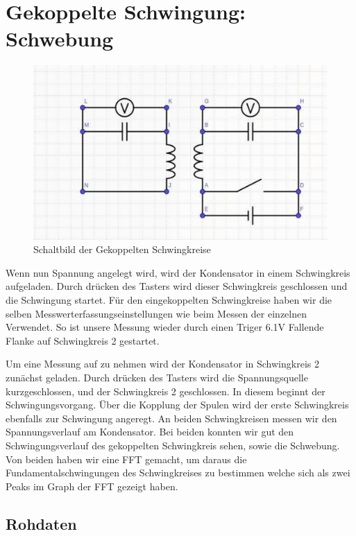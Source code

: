 \documentclass[twoside]{protokoll}
\begin{document}
\section{Gekoppelte Schwingung: Schwebung}

\begin{figure}[H]
    \centering
    \includegraphics[width=1\textwidth]{schaltplan-schwebung.pdf}
    \caption{Schaltbild der Gekoppelten Schwingkreise}
\end{figure}

Wenn nun Spannung angelegt wird, wird der Kondensator in einem Schwingkreis aufgeladen. 
Durch drücken des Tasters wird dieser Schwingkreis geschlossen und die Schwingung startet. 
Für den eingekoppelten Schwingkreise haben wir die selben Messwerterfassungseinstellungen wie beim Messen der einzelnen Verwendet. 
So ist unsere Messung wieder durch einen Triger 6.1V Fallende Flanke auf Schwingkreis 2 gestartet.

Um eine Messung auf zu nehmen wird der Kondensator in Schwingkreis 2 zunächst geladen.
Durch drücken des Tasters wird die Spannungsquelle kurzgeschlossen, und der Schwingkreis 2 geschlossen. In diesem beginnt der Schwingungsvorgang.
Über die Kopplung der Spulen wird der erste Schwingkreis ebenfalls zur Schwingung angeregt. An beiden Schwingkreisen messen wir den Spannungsverlauf am Kondensator. 
Bei beiden konnten wir gut den Schwingungsverlauf des gekoppelten Schwingkreis sehen, sowie die Schwebung. 
Von beiden haben wir eine FFT gemacht, um daraus die Fundamentalschwingungen des Schwingkreises zu bestimmen welche sich als zwei Peaks im Graph der FFT gezeigt haben.\\ 


\subsection{Rohdaten}
\end{document}
